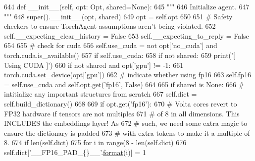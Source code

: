 \begin{DoxyCode}
644     \textcolor{keyword}{def }\_\_init\_\_(self, opt: Opt, shared=\textcolor{keywordtype}{None}):
645         \textcolor{stringliteral}{"""}
646 \textcolor{stringliteral}{        Initialize agent.}
647 \textcolor{stringliteral}{        """}
648         super().\_\_init\_\_(opt, shared)
649         opt = self.opt
650 
651         \textcolor{comment}{# Safety checkers to ensure TorchAgent assumptions aren't being violated.}
652         self.\_\_expecting\_clear\_history = \textcolor{keyword}{False}
653         self.\_\_expecting\_to\_reply = \textcolor{keyword}{False}
654 
655         \textcolor{comment}{# check for cuda}
656         self.use\_cuda = \textcolor{keywordflow}{not} opt[\textcolor{stringliteral}{'no\_cuda'}] \textcolor{keywordflow}{and} torch.cuda.is\_available()
657         \textcolor{keywordflow}{if} self.use\_cuda:
658             \textcolor{keywordflow}{if} \textcolor{keywordflow}{not} shared:
659                 print(\textcolor{stringliteral}{'[ Using CUDA ]'})
660             \textcolor{keywordflow}{if} \textcolor{keywordflow}{not} shared \textcolor{keywordflow}{and} opt[\textcolor{stringliteral}{'gpu'}] != -1:
661                 torch.cuda.set\_device(opt[\textcolor{stringliteral}{'gpu'}])
662         \textcolor{comment}{# indicate whether using fp16}
663         self.fp16 = self.use\_cuda \textcolor{keywordflow}{and} self.opt.get(\textcolor{stringliteral}{'fp16'}, \textcolor{keyword}{False})
664 
665         \textcolor{keywordflow}{if} shared \textcolor{keywordflow}{is} \textcolor{keywordtype}{None}:
666             \textcolor{comment}{# intitialize any important structures from scratch}
667             self.dict = self.build\_dictionary()
668 
669             \textcolor{keywordflow}{if} opt.get(\textcolor{stringliteral}{'fp16'}):
670                 \textcolor{comment}{# Volta cores revert to FP32 hardware if tensors are not multiples}
671                 \textcolor{comment}{# of 8 in all dimensions. This INCLUDES the embeddings layer! As}
672                 \textcolor{comment}{# such, we need some extra magic to ensure the dictionary is padded}
673                 \textcolor{comment}{# with extra tokens to make it a multiple of 8.}
674                 \textcolor{keywordflow}{if} len(self.dict) %
675                     \textcolor{keywordflow}{for} i \textcolor{keywordflow}{in} range(8 - len(self.dict) %
676                         self.dict[\textcolor{stringliteral}{'\_\_FP16\_PAD\_\{\}\_\_'}.\hyperlink{namespaceparlai_1_1chat__service_1_1services_1_1messenger_1_1shared__utils_a32e2e2022b824fbaf80c747160b52a76}{format}(i)] = 1

\end{DoxyCode}
